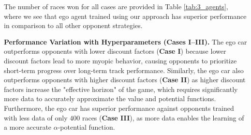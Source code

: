 


\noindent The number of races won for all cases are provided in Table \ref{tab:3_agents}, where we see that \textsf{ego} agent trained using our approach has superior performance in comparison to all other opponent strategies.  

\vspace{1mm}
\noindent \textbf{Performance Variation with Hyperparameters (\textbf{Cases I–III}).}
The \textsf{ego} car outperforms opponents with lower discount factors (\textbf{Case I}) because lower discount factors lead to more myopic behavior, causing opponents to prioritize short-term progress over long-term track performance. Similarly, the \textsf{ego} car also outperforms opponents with higher discount factors (\textbf{Case II}) as higher discount factors increase the "effective horizon" of the game, which requires significantly more data to accurately approximate the value and potential functions.
Furthermore, the \textsf{ego} car has superior performance against opponents trained with less data of only $400$ races (\textbf{Case III}), as more data enables the learning of a more accurate \(\alpha\)-potential function.




